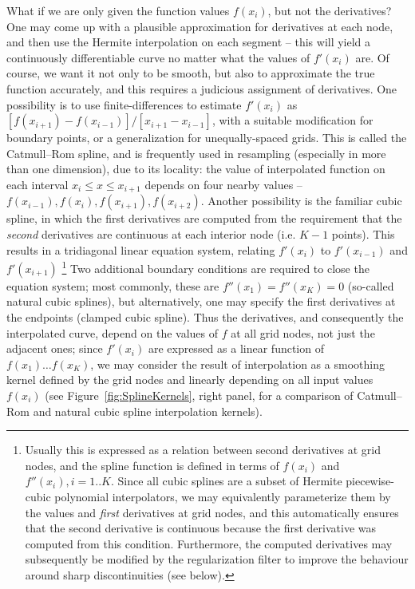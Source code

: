\documentclass[12pt]{article}
\begin{document}
What if we are only given the function values $f(x_i)$, but not the derivatives? One may come up with a plausible approximation for derivatives at each node, and then use the Hermite interpolation on each segment -- this will yield a continuously differentiable curve no matter what the values of $f'(x_i)$ are. Of course, we want it not only to be smooth, but also to approximate the true function accurately, and this requires a judicious assignment of derivatives. One possibility is to use finite-differences to estimate $f'(x_i)$ as $[f(x_{i+1})-f(x_{i-1})]/[x_{i+1}-x_{i-1}]$, with a suitable modification for boundary points, or a generalization for unequally-spaced grids. This is called the Catmull--Rom spline, and is frequently used in resampling (especially in more than one dimension), due to its locality: the value of interpolated function on each interval $x_i\le x\le x_{i+1}$ depends on four nearby values -- $f(x_{i-1}), f(x_i), f(x_{i+1}), f(x_{i+2})$.
Another possibility is the familiar cubic spline, in which the first derivatives are computed from the requirement that the \textit{second} derivatives are continuous at each interior node (i.e. $K-1$ points). This results in a tridiagonal linear equation system, relating $f'(x_i)$ to $f'(x_{i-1})$ and $f'(x_{i+1})$%
\footnote{Usually this is expressed as a relation between second derivatives at grid nodes, and the spline function is defined in terms of $f(x_i)$ and $f''(x_i), i=1..K$. Since all cubic splines are a subset of Hermite piecewise-cubic polynomial interpolators, we may equivalently parameterize them by the values and \textit{first} derivatives at grid nodes, and this automatically ensures that the second derivative is continuous because the first derivative was computed from this condition. Furthermore, the computed derivatives may subsequently be modified by the regularization filter to improve the behaviour around sharp discontinuities (see below). }
Two additional boundary conditions are required to close the equation system; most commonly, these are $f''(x_1) = f''(x_K) = 0$ (so-called natural cubic splines), but alternatively, one may specify the first derivatives at the endpoints (clamped cubic spline). Thus the derivatives, and consequently the interpolated curve, depend on the values of $f$ at all grid nodes, not just the adjacent ones; since $f'(x_i)$ are expressed as a linear function of $f(x_1)\dots f(x_K)$, we may consider the result of interpolation as a smoothing kernel defined by the grid nodes and linearly depending on all input values $f(x_i)$ (see Figure~\ref{fig:SplineKernels}, right panel, for a comparison of Catmull--Rom and natural cubic spline interpolation kernels).
\end{document}
